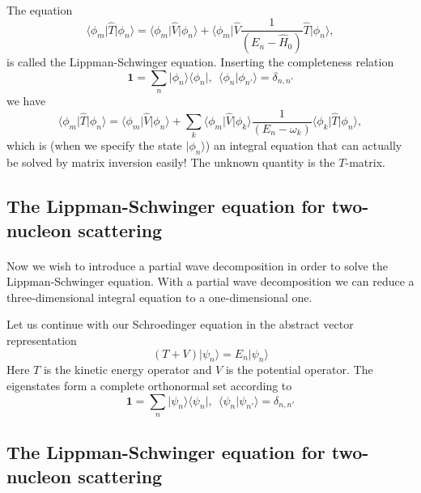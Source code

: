 \documentclass[%
twoside,                 %
final,                   %
10pt]{article}
\begin{document}
\paragraph{}
The equation
\[
\langle \phi_m \vert\hat{T}\vert \phi_n \rangle =\langle \phi_m \vert\hat{V}\vert\phi_n \rangle+\langle \phi_m \vert\hat{V}\frac{1}{(E_n -\hat{H}_0)}\hat{T}\vert \phi_n \rangle,
\]
is called the Lippman-Schwinger equation. Inserting the completeness relation
\[ 
\mathbf{1} = \sum_n \vert \phi_n\rangle\langle \phi_n \vert, \:\: \langle \phi_n\vert \phi_{n'} \rangle = \delta_{n,n'}
\]
we have 
\[
\langle \phi_m \vert\hat{T}\vert \phi_n \rangle =\langle \phi_m \vert\hat{V}\vert\phi_n \rangle+\sum_k \langle \phi_m \vert\hat{V}\vert \phi_k\rangle\frac{1}{(E_n -\omega_k)}\langle \phi_k \vert\hat{T}\vert \phi_n \rangle,
\]
which is (when we specify the state $\vert\phi_n \rangle$) an integral equation that can actually be solved by matrix inversion easily! The unknown quantity is the $T$-matrix.



\subsection*{The Lippman-Schwinger equation for two-nucleon scattering}

\paragraph{}
Now we wish to introduce a partial wave decomposition in order to solve the Lippman-Schwinger equation. With a partial wave decomposition we can reduce a three-dimensional integral equation to a one-dimensional one. 

Let us continue with our Schroedinger equation in the abstract vector representation
\[
\left(T + V\right)\vert\psi_n\rangle = E_n\vert\psi_n \rangle 
\]
Here $T$ is the kinetic energy operator and $V$ is the potential operator. 
The eigenstates form a complete orthonormal set according to 
\[ 
\mathbf{1}=\sum_n\vert\psi_n\rangle\langle\psi_n\vert, \:\: \langle\psi_n\vert\psi_{n'}\rangle =\delta_{n,n'}
\]



\subsection*{The Lippman-Schwinger equation for two-nucleon scattering}
\end{document}

